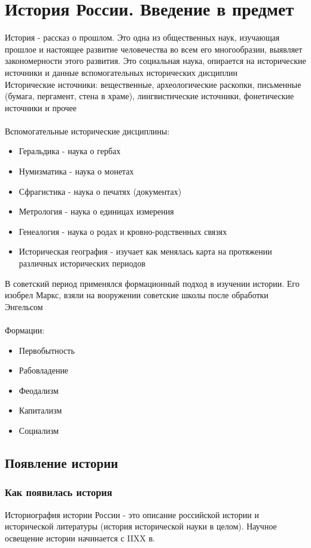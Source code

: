 \documentclass[a4paper, 11pt, oneside]{article}
\begin{document}
\section{История России. Введение в предмет}

История - рассказ о прошлом. Это одна из общественных наук, изучающая прошлое и настоящее развитие человечества во всем его многообразии, выявляет закономерности этого развития. Это социальная наука, опирается на исторические источники и данные вспомогательных исторических дисциплин\\
Исторические источники: вещественные, археологические раскопки, письменные (бумага, пергамент, стена в храме), лингвистические источники, фонетические источники и прочее\\\\
Вспомогательные исторические дисциплины:
\begin{itemize}
	\item Геральдика - наука о гербах
	\item Нумизматика - наука о монетах
	\item Сфрагистика - наука о печатях (документах)
	\item Метрология - наука о единицах измерения
	\item Генеалогия - наука о родах и кровно-родственных связях
	\item Историческая география - изучает как менялась карта на протяжении различных исторических периодов
\end{itemize}
В советский период применялся формационный подход в изучении истории. Его изобрел Маркс, взяли на вооружении советские школы после обработки Энгельсом\\\\
\newpage
Формации:
\begin{itemize}
	\item Первобытность
	\item Рабовладение
	\item Феодализм
	\item Капитализм
	\item Социализм
\end{itemize}

\subsection{Появление истории}
\subsubsection{Как появилась история}
Историография истории России - это описание российской истории и исторической литературы (история исторической науки в целом). Научное освещение истории начинается с IIXX в.
\end{document}
